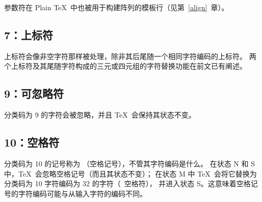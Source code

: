 \documentclass{book}
\begin{document}
参数符在 Plain \TeX\ 中也被用于构建阵列的模板行（见第~\ref{align}~章）。

\subsection{7：上标符}

上标符会像非空字符那样被处理，除非其后尾随一个相同字符编码的上标符。
两个上标符及其尾随字符构成的三元或四元组的字符替换功能在前文已有阐述。

\subsection{9：可忽略符}

分类码为 9 的字符会被忽略，并且 \TeX\ 会保持其状态不变。

\subsection{10：空格符}

分类码为 10 的记号称为 （空格记号），不管其字符编码是什么。
在状态 {\italic N} 和 {\italic S}  中，\TeX\ 会忽略空格记号（而且其状态不变）；
在状态 {\italic M} 中 \TeX\ 会将它替换为分类码为 10 字符编码为 32 的字符（\ascii\ 空格符），
并进入状态 {\italic S}。这意味着空格记号的字符编码可能与从输入字符的编码不同。
\end{document}
